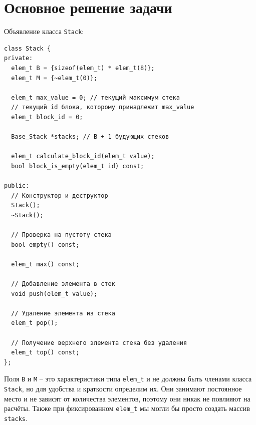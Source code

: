 \section{Основное решение задачи}

Объявление класса \texttt{Stack}:
\begin{verbatim}
class Stack {
private:
  elem_t B = {sizeof(elem_t) * elem_t(8)};
  elem_t M = {~elem_t(0)};

  elem_t max_value = 0; // текущий максимум стека
  // текущий id блока, которому принадлежит max_value
  elem_t block_id = 0;

  Base_Stack *stacks; // B + 1 будующих стеков

  elem_t calculate_block_id(elem_t value);
  bool block_is_empty(elem_t id) const;

public:
  // Конструктор и деструктор
  Stack();
  ~Stack();

  // Проверка на пустоту стека
  bool empty() const;

  elem_t max() const;

  // Добавление элемента в стек
  void push(elem_t value);

  // Удаление элемента из стека
  elem_t pop();

  // Получение верхнего элемента стека без удаления
  elem_t top() const;
};
\end{verbatim}
\begin{mdframed}[style=mdfStyleCode]%
  \begin{remark}\rm%
  Поля \texttt{B} и \texttt{M}  -- это характеристики типа \texttt{elem_t} и не должны быть членами класса \texttt{Stack}, но для удобства и краткости определим их. Они занимают постоянное место и не зависят от количества элементов, поэтому они никак не повлияют на расчёты. Также при фиксированном \texttt{elem_t} мы могли бы просто создать массив \texttt{stacks}. 
\end{remark}
\end{mdframed}

